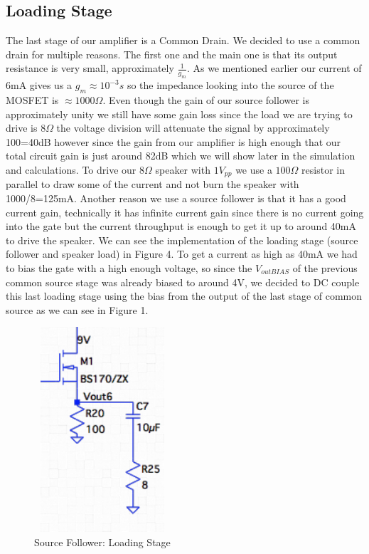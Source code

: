 \documentclass[11pt, twoside, letterpaper]{article}
\begin{document}
\subsection{Loading Stage}
The last stage of our amplifier is a Common Drain. We decided to use a common drain for multiple reasons. The first one and the main one
is that its output resistance is very small, approximately $\frac{1}{g_m}$. As we mentioned earlier our current of 6mA gives us a $g_m\approx10^{-3}s$
so the impedance looking into the source of the MOSFET is $\approx 1000\Omega$. Even though the gain of our source follower is approximately unity we
still have some gain loss since the load we are trying to drive is $8\Omega$ the voltage division will attenuate the signal by approximately 100=40dB 
however since the gain from our amplifier is high enough that our total circuit gain is just around 82dB which we will show later in the simulation 
and calculations. To drive our $8\Omega$ speaker with $1V_{pp}$ we use a $100\Omega$ resistor in parallel to draw some of the current and not burn 
the speaker with 1000/8=125mA. Another reason we use a source follower is that it has a good current gain, technically it has infinite current gain 
since there is no current going into the gate but the current throughput is enough to get it up to around 40mA to drive the speaker. We can see the 
implementation of the loading stage (source follower and speaker load) in Figure 4. To get a current as high as 40mA we had to bias the gate with a 
high enough voltage, so since the $V_{outBIAS}$ of the previous common source stage was already biased to around 4V, we decided to DC couple this 
last loading stage using the bias from the output of the last stage of common source as we can see in Figure 1.

\begin{figure}[htbp]
\begin{center}
\includegraphics[width=2in,height=3in]{SourceFollower.png}
\caption{Source Follower: Loading Stage}
\end{center}
\end{figure}
\FloatBarrier
\end{document}
